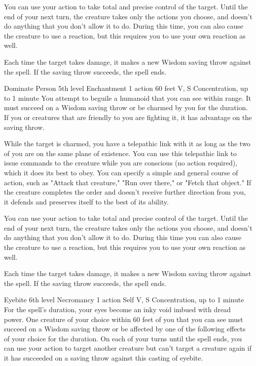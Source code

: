 \documentclass[10pt,a4paper,twoside,bg=print,twocolumn,openany,nodeprecatedcode]{dndbook}
\begin{document}
You can use your action to take total and precise control of the target. Until the end of your next turn, the creature takes only the actions you choose, and doesn't do anything that you don't allow it to do. During this time, you can also cause the creature to use a reaction, but this requires you to use your own reaction as well.

Each time the target takes damage, it makes a new Wisdom saving throw against the spell. If the saving throw succeeds, the spell ends.



\DndSpellHeader%
{Dominate Person}
{5th level Enchantment}
{1 action}
{60 feet}
{V, S}
{Concentration, up to 1 minute}
You attempt to beguile a humanoid that you can see within range. It must succeed on a Wisdom saving throw or be charmed by you for the duration. If you or creatures that are friendly to you are fighting it, it has advantage on the saving throw.

While the target is charmed, you have a telepathic link with it as long as the two of you are on the same plane of existence. You can use this telepathic link to issue commands to the creature while you are conscious (no action required), which it does its best to obey. You can specify a simple and general course of action, such as "Attack that creature," "Run over there," or "Fetch that object." If the creature completes the order and doesn't receive further direction from you, it defends and preserves itself to the best of its ability.

You can use your action to take total and precise control of the target. Until the end of your next turn, the creature takes only the actions you choose, and doesn't do anything that you don't allow it to do. During this time you can also cause the creature to use a reaction, but this requires you to use your own reaction as well.

Each time the target takes damage, it makes a new Wisdom saving throw against the spell. If the saving throw succeeds, the spell ends.



\DndSpellHeader%
{Eyebite}
{6th level Necromancy}
{1 action}
{Self}
{V, S}
{Concentration, up to 1 minute}
For the spell's duration, your eyes become an inky void imbued with dread power. One creature of your choice within 60 feet of you that you can see must succeed on a Wisdom saving throw or be affected by one of the following effects of your choice for the duration. On each of your turns until the spell ends, you can use your action to target another creature but can't target a creature again if it has succeeded on a saving throw against this casting of eyebite.
\end{document}
